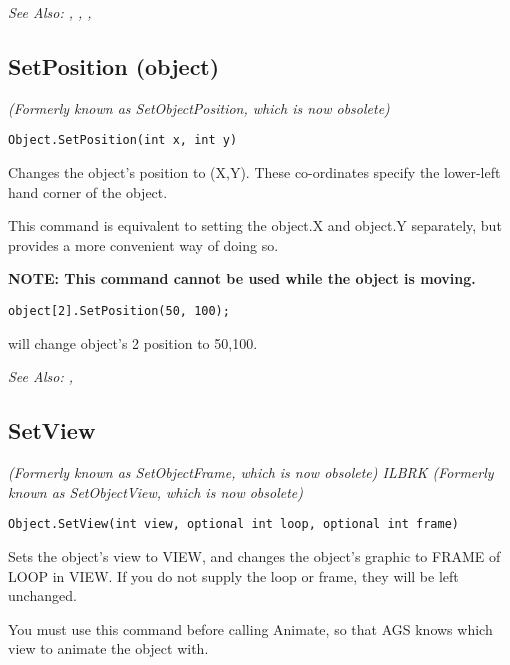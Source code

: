 \it{See Also:} ,
,
,


\subsection{SetPosition (object)}\label{Object.SetPosition}%

\it{(Formerly known as SetObjectPosition, which is now obsolete)}

\begin{verbatim}
Object.SetPosition(int x, int y)
\end{verbatim}
Changes the object's position to (X,Y). These co-ordinates specify the lower-left
hand corner of the object.

This command is equivalent to setting the object.X and object.Y separately, but provides a
more convenient way of doing so.

\bf{NOTE:} This command cannot be used while the object is moving.

\begin{verbatim}
object[2].SetPosition(50, 100);
\end{verbatim}
will change object's 2 position to 50,100.

\it{See Also:} , 


\subsection{SetView}\label{Object.SetView}%

\it{(Formerly known as SetObjectFrame, which is now obsolete)} ILBRK
\it{(Formerly known as SetObjectView, which is now obsolete)}

\begin{verbatim}
Object.SetView(int view, optional int loop, optional int frame)
\end{verbatim}
Sets the object's view to VIEW, and changes the object's graphic to FRAME of LOOP in VIEW.
If you do not supply the loop or frame, they will be left unchanged.

You must use this command before calling Animate, so that AGS knows which view to animate
the object with.


